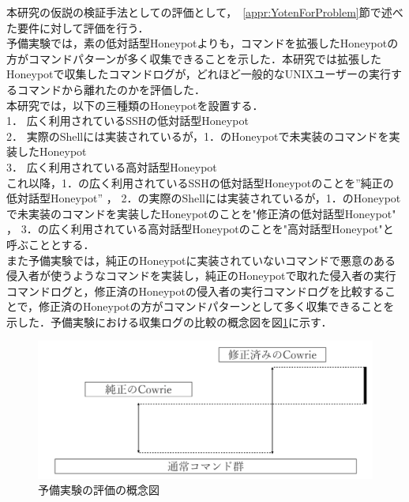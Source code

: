 本研究の仮説の検証手法としての評価として，~\ref{appr:YotenForProblem}節で述べた要件に対して評価を行う．\\
予備実験では，素の低対話型Honeypotよりも，コマンドを拡張したHoneypotの方がコマンドパターンが多く収集できることを示した．本研究では拡張したHoneypotで収集したコマンドログが，どれほど一般的なUNIXユーザーの実行するコマンドから離れたのかを評価した．\\
本研究では，以下の三種類のHoneypotを設置する．\\
1． 広く利用されているSSHの低対話型Honeypot\\
2． 実際のShellには実装されているが，1．のHoneypotで未実装のコマンドを実装したHoneypot\\
3． 広く利用されている高対話型Honeypot\\

これ以降，1．の広く利用されているSSHの低対話型Honeypotのことを”純正の低対話型Honeypot” ， 2．の実際のShellには実装されているが，1．のHoneypotで未実装のコマンドを実装したHoneypotのことを"修正済の低対話型Honeypot" ， 3．の広く利用されている高対話型Honeypotのことを"高対話型Honeypot"と呼ぶこととする．\\


また予備実験では，純正のHoneypotに実装されていないコマンドで悪意のある侵入者が使うようなコマンドを実装し，純正のHoneypotで取れた侵入者の実行コマンドログと，修正済のHoneypotの侵入者の実行コマンドログを比較することで，修正済のHoneypotの方がコマンドパターンとして多く収集できることを示した．予備実験における収集ログの比較の概念図を図\ref{fig:yobigainen}に示す．

\begin{figure}[htbp]
    \centering
    \includegraphics[width=1.0\textwidth]{figures/termhyoka.png}
    \caption{予備実験の評価の概念図}
    \label{fig:yobigainen}
\end{figure}

